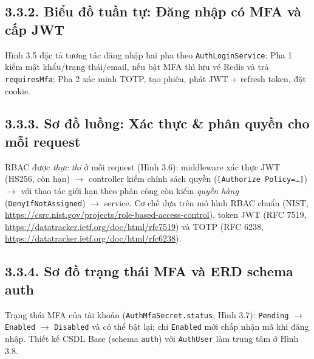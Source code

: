\subsection*{3.3.2. Biểu đồ tuần tự: Đăng nhập có MFA và cấp JWT}
Hình 3.5 đặc tả tương tác đăng nhập hai pha theo \texttt{AuthLoginService}: Pha 1 kiểm mật khẩu/trạng thái/email, nếu bật MFA thì lưu vé Redis và trả \texttt{requiresMfa}; Pha 2 xác minh TOTP, tạo phiên, phát JWT + refresh token, đặt cookie.


\subsection*{3.3.3. Sơ đồ luồng: Xác thực \& phân quyền cho mỗi request}
RBAC được \emph{thực thi} ở mỗi request (Hình 3.6): middleware xác thực JWT (HS256, còn hạn) $\rightarrow$ controller kiểm chính sách quyền (\texttt{[Authorize Policy=\ldots]}) $\rightarrow$ với thao tác giới hạn theo phân công còn kiểm \emph{quyền hàng} (\texttt{DenyIfNotAssigned}) $\rightarrow$ service. Cơ chế dựa trên mô hình RBAC chuẩn (NIST, \url{https://csrc.nist.gov/projects/role-based-access-control}), token JWT (RFC 7519, \url{https://datatracker.ietf.org/doc/html/rfc7519}) và TOTP (RFC 6238, \url{https://datatracker.ietf.org/doc/html/rfc6238}).



\subsection*{3.3.4. Sơ đồ trạng thái MFA và ERD schema auth}
Trạng thái MFA của tài khoản (\texttt{AuthMfaSecret.status}, Hình 3.7): \texttt{Pending} $\rightarrow$ \texttt{Enabled} $\rightarrow$ \texttt{Disabled} và có thể bật lại; chỉ \texttt{Enabled} mới chấp nhận mã khi đăng nhập. Thiết kế CSDL Base (schema \texttt{auth}) với \texttt{AuthUser} làm trung tâm ở Hình 3.8.

